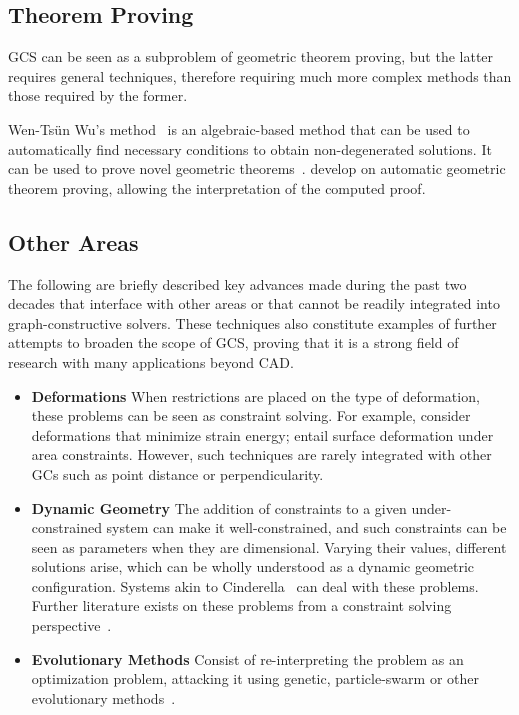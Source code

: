 \subsection{Theorem Proving}%
\label{sec:intro.constraints.proving}

\ac{GCS} can be seen as a subproblem of geometric theorem proving, but the
latter requires general techniques, therefore requiring much more complex
methods than those required by the former.

Wen-Tsün Wu's method~\cite{Wu:1984:BPMCTPG,Wu:1994:MTPG} is an algebraic-based
method that can be used to automatically find necessary conditions to obtain
non-degenerated solutions.  It can be used to prove novel geometric
theorems~\cite{Chou:1988:IWMMTPG}.
 develop on automatic geometric
theorem proving, allowing the interpretation of the computed proof.

\subsection{Other Areas}%
\label{sec:intro.constraints.other}

The following are briefly described key advances made during the past two
decades that interface with other areas or that cannot be readily integrated
into graph-constructive solvers.  These techniques also constitute examples of
further attempts to broaden the scope of \ac{GCS}, proving that it is a strong
field of research with many applications beyond \ac{CAD}.

\begin{itemize}
  \item[] \textbf{Deformations} When restrictions are placed on the type of
  deformation, these problems can be seen as constraint solving.  For
  example, \citet{Ahn:2014:GCQBCUML,Bao:2010:BIVCMSE,Moll:2006:PPDLO} consider
  deformations that minimize strain energy;  entail
  surface deformation under area constraints.  However, such techniques are
  rarely integrated with other \acp{GC} such as point distance or
  perpendicularity.
  \item[] \textbf{Dynamic Geometry} The addition of constraints to a given
  under-constrained system can make it well-constrained, and such constraints
  can be seen as parameters when they are dimensional.  Varying their values,
  different solutions arise, which can be wholly understood as a dynamic
  geometric configuration.  Systems akin to
  Cinderella~\cite{Richter:2012:Cinderella.2} can deal with these problems.
  Further literature exists on these problems from a constraint solving
  perspective~\cite{Freixas:2010:CDGS}.
  \item[] \textbf{Evolutionary Methods} Consist of re-interpreting the problem
  as an optimization problem, attacking it using genetic, particle-swarm or
  other evolutionary methods~\cite{Chunhong:2006:PDBOEA,Li:2012:HASPSOASGCP}.
\end{itemize}
